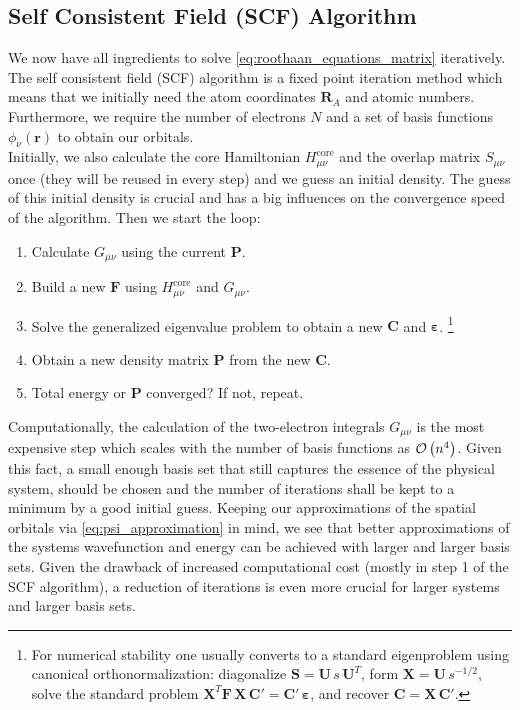 \subsection{Self Consistent Field (SCF) Algorithm}
\label{subsec:background_hf_scf}
We now have all ingredients to solve \autoref{eq:roothaan_equations_matrix} iteratively. The self consistent field (SCF) algorithm is a fixed point iteration method which means that we initially need the atom coordinates $\mathbf{R}_A$ and atomic numbers. Furthermore, we require the number of electrons $N$ and a set of basis functions $\phi_\nu(\mathbf{r})$ to obtain our orbitals.\\
Initially, we also calculate the core Hamiltonian $H_{\mu\nu}^\text{core}$ and the overlap matrix $S_{\mu\nu}$ once (they will be reused in every step) and we guess an initial density. The guess of this initial density is crucial and has a big influences on the convergence speed of the algorithm. Then we start the loop: 
\begin{enumerate}[itemsep=0.1em]
    \item Calculate $G_{\mu\nu}$ using the current $\mathbf{P}$.
    \item Build a new $\mathbf{F}$ using $H_{\mu\nu}^\text{core}$ and $G_{\mu\nu}$.
    \item Solve the generalized eigenvalue problem to obtain a new $\mathbf{C}$ and $\boldsymbol{\varepsilon}$. \footnote{For numerical stability one usually converts to a standard eigenproblem using canonical orthonormalization: diagonalize $\mathbf{S}=\mathbf{U}\,s\,\mathbf{U}^T$, form $\mathbf{X}=\mathbf{U}\,s^{-1/2}$, solve the standard problem $\mathbf{X}^T\mathbf{F}\,\mathbf{X}\,\mathbf{C}'=\mathbf{C}'\,\boldsymbol{\varepsilon}$, and recover $\mathbf{C}=\mathbf{X}\,\mathbf{C}'$.}
    \item Obtain a new density matrix $\mathbf{P}$ from the new $\mathbf{C}$.
    \item Total energy or $\mathbf{P}$ converged? If not, repeat.
\end{enumerate}

Computationally, the calculation of the two-electron integrals $G_{\mu\nu}$ is the most expensive step which scales with the number of basis functions as $\mathcal{O}\left(n^4\right)$. Given this fact, a small enough basis set that still captures the essence of the physical system, should be chosen and the number of iterations shall be kept to a minimum by a good initial guess. Keeping our approximations of the spatial orbitals via \autoref{eq:psi_approximation} in mind, we see that better approximations of the systems wavefunction and energy can be achieved with larger and larger basis sets. Given the drawback of increased computational cost (mostly in step 1 of the SCF algorithm), a reduction of iterations is even more crucial for larger systems and larger basis sets.
